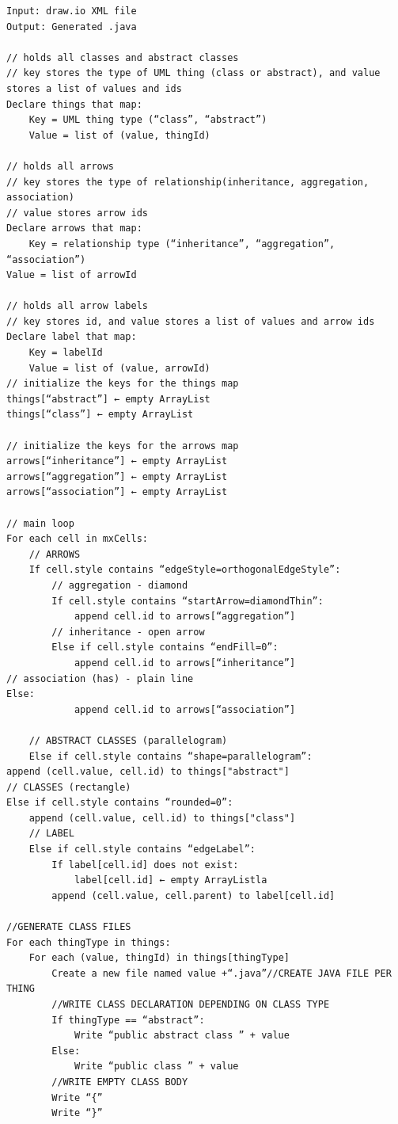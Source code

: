 \begin{verbatim}
Input: draw.io XML file 
Output: Generated .java

// holds all classes and abstract classes
// key stores the type of UML thing (class or abstract), and value stores a list of values and ids
Declare things that map:
	Key = UML thing type (“class”, “abstract”)
	Value = list of (value, thingId)

// holds all arrows
// key stores the type of relationship(inheritance, aggregation, association)
// value stores arrow ids
Declare arrows that map:
	Key = relationship type (“inheritance”, “aggregation”, “association”)
Value = list of arrowId

// holds all arrow labels
// key stores id, and value stores a list of values and arrow ids
Declare label that map:
	Key = labelId
	Value = list of (value, arrowId)
// initialize the keys for the things map
things[“abstract”] ← empty ArrayList
things[“class”] ← empty ArrayList

// initialize the keys for the arrows map
arrows[“inheritance”] ← empty ArrayList
arrows[“aggregation”] ← empty ArrayList
arrows[“association”] ← empty ArrayList

// main loop
For each cell in mxCells:
	// ARROWS
	If cell.style contains “edgeStyle=orthogonalEdgeStyle”:
		// aggregation - diamond
		If cell.style contains “startArrow=diamondThin”:
			append cell.id to arrows[“aggregation”]
		// inheritance - open arrow
		Else if cell.style contains “endFill=0”:
			append cell.id to arrows[“inheritance”]
// association (has) - plain line
Else:
			append cell.id to arrows[“association”]

	// ABSTRACT CLASSES (parallelogram)
	Else if cell.style contains “shape=parallelogram”:
append (cell.value, cell.id) to things["abstract"]
// CLASSES (rectangle)
Else if cell.style contains “rounded=0”:
	append (cell.value, cell.id) to things["class"]
	// LABEL
	Else if cell.style contains “edgeLabel”:
		If label[cell.id] does not exist:
			label[cell.id] ← empty ArrayListla
		append (cell.value, cell.parent) to label[cell.id]

//GENERATE CLASS FILES
For each thingType in things: 
	For each (value, thingId) in things[thingType]
		Create a new file named value +“.java”//CREATE JAVA FILE PER THING
		//WRITE CLASS DECLARATION DEPENDING ON CLASS TYPE
		If thingType == “abstract”:
			Write “public abstract class ” + value
		Else:
			Write “public class ” + value
		//WRITE EMPTY CLASS BODY
		Write “{”
		Write “}”


\end{verbatim}
